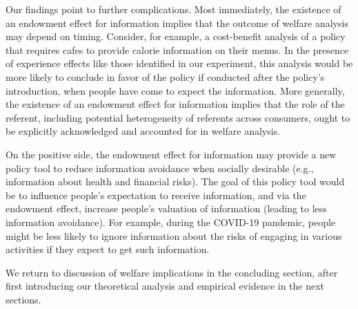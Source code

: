 Our findings point to further complications. Most immediately, the existence of an endowment effect for information implies that the outcome of welfare analysis may depend on timing. Consider, for example, a cost-benefit analysis of a policy that requires cafes to provide calorie information on their menus. In the presence of experience effects like those identified in our experiment, this analysis would be more likely to conclude in favor of the policy if conducted after the policy’s introduction, when people have come to expect the information. More generally, the existence of an endowment effect for information implies that the role of the referent, including potential heterogeneity of referents across consumers, ought to be explicitly acknowledged and accounted for in welfare analysis.


On the positive side, the endowment effect for information may provide a new policy tool to reduce information avoidance when socially desirable (e.g., information about health and financial risks). The goal of this policy tool would be to influence people's expectation to receive information, and via the endowment effect, increase people's valuation of information (leading to less information avoidance). For example, during the COVID-19 pandemic, people might be less likely to ignore information about the risks of engaging in various activities if they expect to get such information.

We return to discussion of welfare implications in the concluding section, after first introducing our theoretical analysis and empirical evidence in the next sections.
